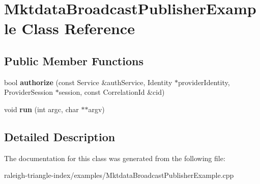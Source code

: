 \section{Mktdata\+Broadcast\+Publisher\+Example Class Reference}
\label{class_mktdata_broadcast_publisher_example}
\subsection*{Public Member Functions}
\begin{DoxyCompactItemize}
\item 
bool {\bfseries authorize} (const Service \&auth\+Service, Identity $\ast$provider\+Identity, Provider\+Session $\ast$session, const Correlation\+Id \&cid)\label{class_mktdata_broadcast_publisher_example_ab975f7fbb326a9a5e2fce38728f4ad8a}

\item 
void {\bfseries run} (int argc, char $\ast$$\ast$argv)\label{class_mktdata_broadcast_publisher_example_a316639fba6790697f93c3e0bbe8ae7e4}

\end{DoxyCompactItemize}


\subsection{Detailed Description}


The documentation for this class was generated from the following file\+:\begin{DoxyCompactItemize}
\item 
raleigh-\/triangle-\/index/examples/Mktdata\+Broadcast\+Publisher\+Example.\+cpp\end{DoxyCompactItemize}
